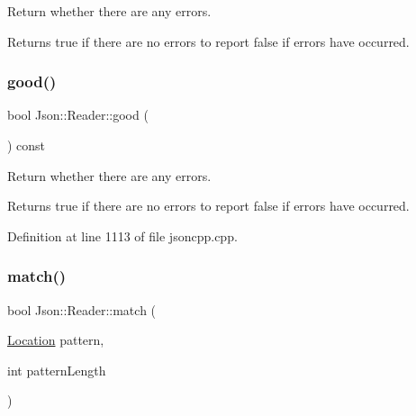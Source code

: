 Return whether there are any errors. 

\begin{DoxyReturn}{Returns}
{\ttfamily true} if there are no errors to report {\ttfamily false} if errors have occurred. 
\end{DoxyReturn}
\hypertarget{class_json_1_1_reader_a86cbb42b3e6d4a4d6416473b1a8f6ae7}{}\label{class_json_1_1_reader_a86cbb42b3e6d4a4d6416473b1a8f6ae7} 
\subsubsection{\texorpdfstring{good()}{good()}\hspace{0.1cm}{\footnotesize\ttfamily [2/2]}}
{\footnotesize\ttfamily bool Json\+::\+Reader\+::good (\begin{DoxyParamCaption}{ }\end{DoxyParamCaption}) const}



Return whether there are any errors. 

\begin{DoxyReturn}{Returns}
{\ttfamily true} if there are no errors to report {\ttfamily false} if errors have occurred. 
\end{DoxyReturn}


Definition at line 1113 of file jsoncpp.\+cpp.

\hypertarget{class_json_1_1_reader_a3e5a7bc6b7b53f2ca8cb9da42f8ffb21}{}\label{class_json_1_1_reader_a3e5a7bc6b7b53f2ca8cb9da42f8ffb21} 
\subsubsection{\texorpdfstring{match()}{match()}\hspace{0.1cm}{\footnotesize\ttfamily [1/2]}}
{\footnotesize\ttfamily bool Json\+::\+Reader\+::match (\begin{DoxyParamCaption}\item[{\hyperlink{class_json_1_1_reader_a46795b5b272bf79a7730e406cb96375a}{Location}}]{pattern,  }\item[{int}]{pattern\+Length }\end{DoxyParamCaption})\hspace{0.3cm}{\ttfamily [private]}}

\hypertarget{class_json_1_1_reader_a3e5a7bc6b7b53f2ca8cb9da42f8ffb21}{}\label{class_json_1_1_reader_a3e5a7bc6b7b53f2ca8cb9da42f8ffb21} 

